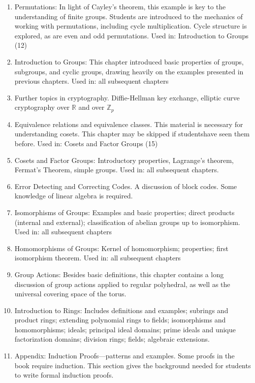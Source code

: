 \begin{enumerate}
\item
Permutations: In light of Cayley’s theorem, this example is key to the understanding of finite groups. Students are introduced to the mechanics of working with permutations, including cycle multiplication. Cycle structure is explored, as are even and odd permutations. Used in:  Introduction to Groups (12)
\item
Introduction to Groups: This chapter introduced basic properties of groups, subgroups, and cyclic groups, drawing heavily on the examples presented in previous chapters. Used in:  all subsequent chapters
\item
Further topics in cryptography.  Diffie-Hellman key exchange, elliptic curve cryptography over ${\mathbb R}$ and over ${\mathbb Z}_p$
\item
Equivalence relations and equivalence classes. This material is necessary for understanding cosets. This chapter may be skipped if studentshave seen them before.  Used in:  Cosets and Factor Groups (15)
\item
Cosets and Factor Groups: Introductory properties, Lagrange’s theorem, Fermat’s Theorem, simple groups.  Used in: all subsequent chapters.
\item
Error Detecting and Correcting Codes. A discussion of block codes. Some knowledge of linear algebra is required.
\item
Isomorphisms of Groups: Examples and basic properties; direct products (internal and external); classification of abelian groups up to isomorphism. Used in: all subsequent chapters
\item
Homomorphisms of Groups: Kernel of homomorphism; properties; first isomorphism theorem.  Used in: all subsequent chapters
\item
Group Actions: Besides basic definitions, this chapter contains a long discussion of group actions applied to regular polyhedral, as well as the universal covering space of the torus.
\item
Introduction to Rings:  Includes definitions and examples; subrings and product rings; extending polynomial rings to fields;  isomorphisms and homomorphisms; ideals; principal ideal domains; prime ideals and unique factorization domains; division rings; fields;  algebraic extensions. 
\item
Appendix: Induction Proofs—patterns and examples.  Some proofs in the book require induction. This section gives the background needed for students to write formal induction proofs. 
\end{enumerate}

